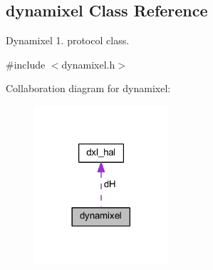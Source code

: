 \hypertarget{a00004}{}\subsection{dynamixel Class Reference}
\label{a00004}


Dynamixel 1. protocol class.  




{\ttfamily \#include $<$dynamixel.\+h$>$}



Collaboration diagram for dynamixel\+:\nopagebreak
\begin{figure}[H]
\begin{center}
\leavevmode
\includegraphics[width=141pt]{dc/d87/a00032}
\end{center}
\end{figure}
